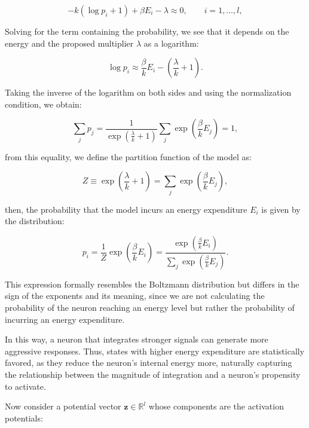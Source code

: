 \documentclass[12pt]{article}
\begin{document}
\begin{equation}
-k (\log p_i + 1) + \beta E_i - \lambda \approx 0, \qquad i = 1, \dots, l,
\end{equation}

Solving for the term containing the probability, we see that it depends on the energy and the proposed multiplier $\lambda$ as a logarithm:

\begin{equation}
\log p_i \approx \frac{\beta}{k} E_i - \left(\frac{\lambda}{k} + 1\right)  .
\end{equation}

Taking the inverse of the logarithm on both sides and using the normalization condition, we obtain:

\begin{equation}
\sum_j p_j = \frac{1}{\exp(\frac{\lambda}{k} + 1)} \sum_j \exp\left(\frac{\beta}{k} E_j\right) = 1,
\end{equation}

from this equality, we define the partition function of the model as:

\begin{equation}
Z \equiv \exp\left(\frac{\lambda}{k} + 1\right) = \sum_j \exp\left(\frac{\beta}{k} E_j\right),
\end{equation}

then, the probability that the model incurs an energy expenditure $E_i$ is given by the distribution:

\begin{equation}
p_i = \frac{1}{Z} \exp\left(\frac{\beta}{k} E_i\right) = \frac{\exp(\frac{\beta}{k} E_i)}{\sum_j \exp(\frac{\beta}{k} E_j)}  .
\end{equation}

This expression formally resembles the Boltzmann distribution but differs in the sign of the exponents and its meaning, since we are not calculating the probability of the neuron reaching an energy level but rather the probability of incurring an energy expenditure.

In this way, a neuron that integrates stronger signals can generate more aggressive responses. Thus, states with higher energy expenditure are statistically favored, as they reduce the neuron’s internal energy more, naturally capturing the relationship between the magnitude of integration and a neuron’s propensity to activate.

Now consider a potential vector $\mathbf{z} \in \mathbb{R}^l$ whose components are the activation potentials:
\end{document}
